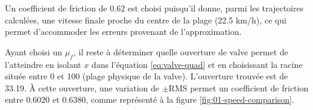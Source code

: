 Un coefficient de friction de $0.62$ est choisi puisqu'il donne, parmi les
trajectoires calculées, une vitesse finale proche du centre de la plage (22.5
km/h), ce qui permet d'accommoder les erreurs provenant de l'approximation.

Ayant choisi un $\mu_f$, il reste à déterminer quelle ouverture de valve permet
de l'atteindre en isolant $x$ dans l'équation \ref{eq:valve-quad} et en
choisissant la racine située entre 0 et 100 (plage physique de la valve).
L'ouverture trouvée est de 33.19. À cette ouverture, une variation de $\pm$RMS
permet un coefficient de friction entre 0.6020 et 0.6380, comme représenté à la
figure \ref{fig:01-speed-comparison}.
